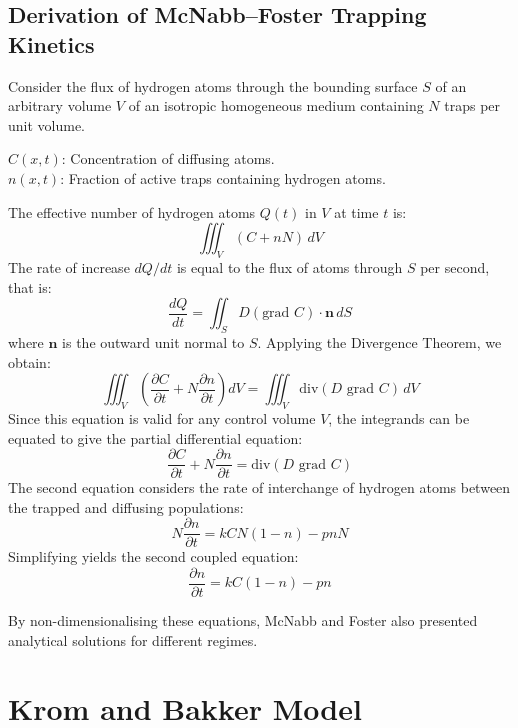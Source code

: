 \documentclass[a4paper,12pt,oneside]{report}
\begin{document}
\subsection{Derivation of McNabb--Foster Trapping Kinetics}

Consider the flux of hydrogen atoms through the bounding surface $S$ of an arbitrary volume $V$ of an isotropic homogeneous medium containing $N$ traps per unit volume.

\noindent $C(x, t)$: Concentration of diffusing atoms.\\
\noindent $n(x, t)$: Fraction of active traps containing hydrogen atoms.

The effective number of hydrogen atoms $Q(t)$ in $V$ at time $t$ is:
\begin{equation*}
\iiint_V (C + nN) \, dV
\end{equation*}
The rate of increase $dQ/dt$ is equal to the flux of atoms through $S$ per second, that is:
\begin{equation*}
\frac{dQ}{dt} = \iint_S D(\text{grad } C) \cdot \mathbf{n} \, dS
\end{equation*}
where $\mathbf{n}$ is the outward unit normal to $S$. Applying the Divergence Theorem, we obtain:
\begin{equation*}
\iiint_V \left( \frac{\partial C}{\partial t} + N \frac{\partial n}{\partial t} \right) dV = \iiint_V \text{div}(D \text{ grad } C) \, dV
\end{equation*}
Since this equation is valid for any control volume $V$, the integrands can be equated to give the partial differential equation:
\begin{equation}
\frac{\partial C}{\partial t} + N \frac{\partial n}{\partial t} = \text{div}(D \text{ grad } C)
\label{eq:ch3_mf_pde}
\end{equation}
The second equation considers the rate of interchange of hydrogen atoms between the trapped and diffusing populations:
\begin{equation*}
N \frac{\partial n}{\partial t} = kCN(1 - n) - pnN
\end{equation*}
Simplifying yields the second coupled equation:
\begin{equation}
\frac{\partial n}{\partial t} = kC(1 - n) - pn
\label{eq:ch3_mf_trap}
\end{equation}

By non-dimensionalising these equations, McNabb and Foster also presented analytical solutions for different regimes.

\section{Krom and Bakker Model}
\end{document}
